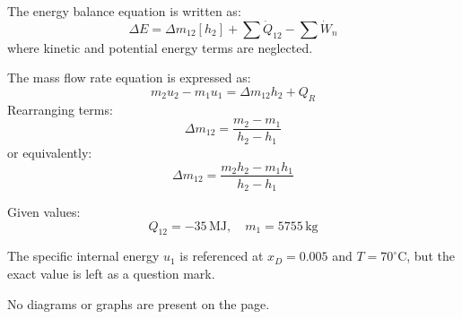 The energy balance equation is written as:  
\[
\Delta E = \Delta m_{12} \left[ h_2 \right] + \sum \dot{Q}_{12} - \sum \dot{W}_n
\]  
where kinetic and potential energy terms are neglected.  

The mass flow rate equation is expressed as:  
\[
m_2 u_2 - m_1 u_1 = \Delta m_{12} h_2 + Q_{R}
\]  
Rearranging terms:  
\[
\Delta m_{12} = \frac{m_2 - m_1}{h_2 - h_1}
\]  
or equivalently:  
\[
\Delta m_{12} = \frac{m_2 h_2 - m_1 h_1}{h_2 - h_1}
\]  

Given values:  
\[
Q_{12} = -35 \, \text{MJ}, \quad m_1 = 5755 \, \text{kg}
\]  

The specific internal energy \( u_1 \) is referenced at \( x_D = 0.005 \) and \( T = 70^\circ\text{C} \), but the exact value is left as a question mark.  

No diagrams or graphs are present on the page.